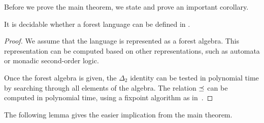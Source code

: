 \documentclass{LMCS}
\begin{document}
Before we prove the main theorem, we state and prove
an important corollary.
\begin{cor}\label{cor:decid}
  It is decidable whether a forest language can be defined in \Dtwol.
\end{cor}
\begin{proof}
  We assume that the language is represented as a forest algebra. This
  representation can be computed based on other representations, such
  as automata or monadic second-order logic. 

  Once the forest algebra is given, the $\Delta_2$ identity can be
  tested in polynomial time by searching through all elements of the
  algebra. The relation $\preceq$ can be computed in polynomial time,
  using a fixpoint algorithm as in~\cite{fo2tree}.
\end{proof}



The following lemma gives the easier implication from the main theorem.
\end{document}
